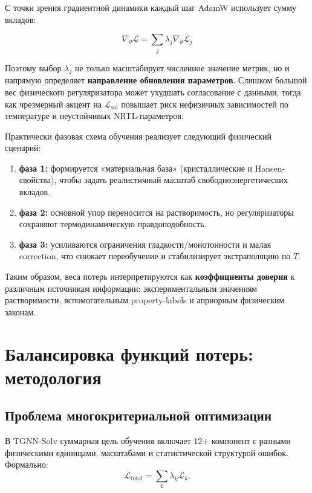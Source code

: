\documentclass[11pt]{article}
\begin{document}
С точки зрения градиентной динамики каждый шаг AdamW использует сумму вкладов:

\begin{equation*}
\nabla_\theta \mathcal{L} = \sum_j \lambda_j \nabla_\theta \mathcal{L}_j
\end{equation*}

Поэтому выбор $\lambda_j$ не только масштабирует численное значение метрик, но и напрямую определяет \textbf{направление обновления параметров}. Слишком большой вес физического регуляризатора может ухудшать согласование с данными, тогда как чрезмерный акцент на $\mathcal{L}_{\mathrm{sol}}$ повышает риск нефизичных зависимостей по температуре и неустойчивых NRTL-параметров.

Практически фазовая схема обучения реализует следующий физический сценарий:

\begin{enumerate}
    \item \textbf{фаза 1:} формируется «материальная база» (кристаллические и Hansen-свойства), чтобы задать реалистичный масштаб свободноэнергетических вкладов.
    \item \textbf{фаза 2:} основной упор переносится на растворимость, но регуляризаторы сохраняют термодинамическую правдоподобность.
    \item \textbf{фаза 3:} усиливаются ограничения гладкости/монотонности и малая correction, что снижает переобучение и стабилизирует экстраполяцию по $T$.
\end{enumerate}

Таким образом, веса потерь интерпретируются как \textbf{коэффициенты доверия} к различным источникам информации: экспериментальным значениям растворимости, вспомогательным property-labels и априорным физическим законам.


\section{Балансировка функций потерь: методология}

\subsection{Проблема многокритериальной оптимизации}

В TGNN-Solv суммарная цель обучения включает 12+ компонент с разными физическими единицами, масштабами и статистической структурой ошибок. Формально:
\begin{equation*}
\mathcal{L}_{\mathrm{total}} = \sum_k \lambda_k \mathcal{L}_k.
\end{equation*}
\end{document}
